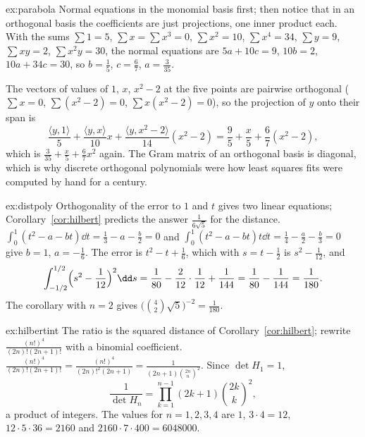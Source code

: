 \begin{solution}{ex:parabola}
\idea Normal equations in the monomial basis first; then notice that in an orthogonal basis the coefficients are just
projections, one inner product each.
\writeup With the sums $\sum1=5$, $\sum x=\sum x^3=0$, $\sum x^2=10$, $\sum x^4=34$, $\sum y=9$, $\sum xy=2$, $\sum
x^2y=30$, the normal equations are $5a+10c=9$, $10b=2$, $10a+34c=30$, so $b=\frac15$, $c=\frac67$, $a=\frac3{35}$.

The vectors of values of $1$, $x$, $x^2-2$ at the five points are pairwise orthogonal ($\sum x=0$, $\sum(x^2-2)=0$,
$\sum x(x^2-2)=0$), so the projection of $y$ onto their span is
\[
\frac{\langle y,1\rangle}{5}+\frac{\langle y,x\rangle}{10}x+\frac{\langle y,x^2-2\rangle}{14}(x^2-2)=\frac95+\frac x5+
\frac67(x^2-2),
\]
which is $\frac3{35}+\frac x5+\frac67x^2$ again. The Gram matrix of an orthogonal basis is diagonal, which is why discrete
orthogonal polynomials were how least squares fits were computed by hand for a century.
\end{solution}

\begin{solution}{ex:distpoly}
\idea Orthogonality of the error to $1$ and $t$ gives two linear equations; Corollary~\ref{cor:hilbert} predicts the
answer $\frac1{6\sqrt5}$ for the distance.
\writeup $\int_0^1(t^2-a-bt)\dd t=\frac13-a-\frac b2=0$ and $\int_0^1(t^2-a-bt)t\dd t=\frac14-\frac a2-\frac b3=0$ give
$b=1$, $a=-\frac16$. The error is $t^2-t+\frac16$, which with $s=t-\frac12$ is $s^2-\frac1{12}$, and
\[
\int_{-1/2}^{1/2}\Bigl(s^2-\frac1{12}\Bigr)^2\dd s=\frac1{80}-\frac2{12}\cdot\frac1{12}+\frac1{144}=\frac1{80}-\frac1{144}=\frac1{180}.
\]
The corollary with $n=2$ gives $\bigl(\binom42\sqrt5\bigr)^{-2}=\frac1{180}$.
\end{solution}

\begin{solution}{ex:hilbertint}
\idea The ratio is the squared distance of Corollary~\ref{cor:hilbert}; rewrite $\frac{(n!)^4}{(2n)!(2n+1)!}$ with a
binomial coefficient.
\writeup $\frac{(n!)^4}{(2n)!(2n+1)!}=\frac{(n!)^4}{(2n)!^2(2n+1)}=\frac1{(2n+1)\binom{2n}n^2}$. Since $\det H_1=1$,
\[
\frac1{\det H_n}=\prod_{k=1}^{n-1}(2k+1)\binom{2k}k^2,
\]
a product of integers. The values for $n=1,2,3,4$ are $1$, $3\cdot4=12$, $12\cdot5\cdot36=2160$ and $2160\cdot7\cdot400=
6048000$.
\end{solution}

